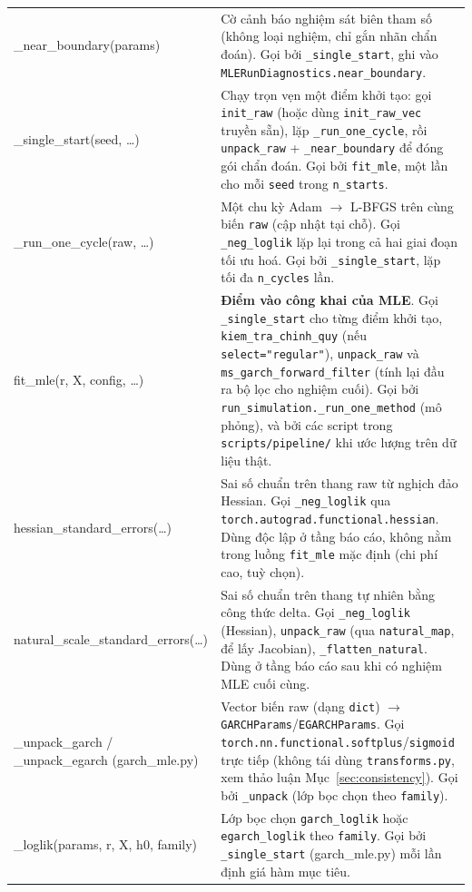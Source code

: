 \documentclass[11pt,a4paper]{article}
\newcommand{\code}[1]{\texttt{#1}}
\begin{document}
\begin{longtable}{@{}>{\ttfamily\scriptsize\raggedright\arraybackslash}p{5.0cm} >{\raggedright\arraybackslash}p{9.5cm}@{}}
\_near\_boundary(params) & Cờ cảnh báo nghiệm sát biên tham số (không loại nghiệm, chỉ gắn nhãn chẩn đoán). Gọi bởi \code{\_single\_start}, ghi vào \code{MLERunDiagnostics.near\_boundary}. \\
\_single\_start(seed, \ldots) & Chạy trọn vẹn một điểm khởi tạo: gọi \code{init\_raw} (hoặc dùng \code{init\_raw\_vec} truyền sẵn), lặp \code{\_run\_one\_cycle}, rồi \code{unpack\_raw} + \code{\_near\_boundary} để đóng gói chẩn đoán. Gọi bởi \code{fit\_mle}, một lần cho mỗi \code{seed} trong \code{n\_starts}. \\
\_run\_one\_cycle(raw, \ldots) & Một chu kỳ Adam $\to$ L-BFGS trên cùng biến \code{raw} (cập nhật tại chỗ). Gọi \code{\_neg\_loglik} lặp lại trong cả hai giai đoạn tối ưu hoá. Gọi bởi \code{\_single\_start}, lặp tối đa \code{n\_cycles} lần. \\
fit\_mle(r, X, config, \ldots) & \textbf{Điểm vào công khai của MLE}. Gọi \code{\_single\_start} cho từng điểm khởi tạo, \code{kiem\_tra\_chinh\_quy} (nếu \code{select="regular"}), \code{unpack\_raw} và \code{ms\_garch\_forward\_filter} (tính lại đầu ra bộ lọc cho nghiệm cuối). Gọi bởi \code{run\_simulation.\_run\_one\_method} (mô phỏng), và bởi các script trong \code{scripts/pipeline/} khi ước lượng trên dữ liệu thật. \\
hessian\_standard\_errors(\ldots) & Sai số chuẩn trên thang raw từ nghịch đảo Hessian. Gọi \code{\_neg\_loglik} qua \code{torch.autograd.functional.hessian}. Dùng độc lập ở tầng báo cáo, không nằm trong luồng \code{fit\_mle} mặc định (chi phí cao, tuỳ chọn). \\
natural\_scale\_standard\_errors(\ldots) & Sai số chuẩn trên thang tự nhiên bằng công thức delta. Gọi \code{\_neg\_loglik} (Hessian), \code{unpack\_raw} (qua \code{natural\_map}, để lấy Jacobian), \code{\_flatten\_natural}. Dùng ở tầng báo cáo sau khi có nghiệm MLE cuối cùng. \\
\_unpack\_garch / \_unpack\_egarch \newline \footnotesize{(garch\_mle.py)} & Vector biến raw (dạng \code{dict}) $\to$ \code{GARCHParams}/\code{EGARCHParams}. Gọi \code{torch.nn.functional.softplus}/\code{sigmoid} trực tiếp (không tái dùng \code{transforms.py}, xem thảo luận Mục~\ref{sec:consistency}). Gọi bởi \code{\_unpack} (lớp bọc chọn theo \code{family}). \\
\_loglik(params, r, X, h0, family) & Lớp bọc chọn \code{garch\_loglik} hoặc \code{egarch\_loglik} theo \code{family}. Gọi bởi \code{\_single\_start} (garch\_mle.py) mỗi lần định giá hàm mục tiêu. \\

\end{longtable}
\end{document}
